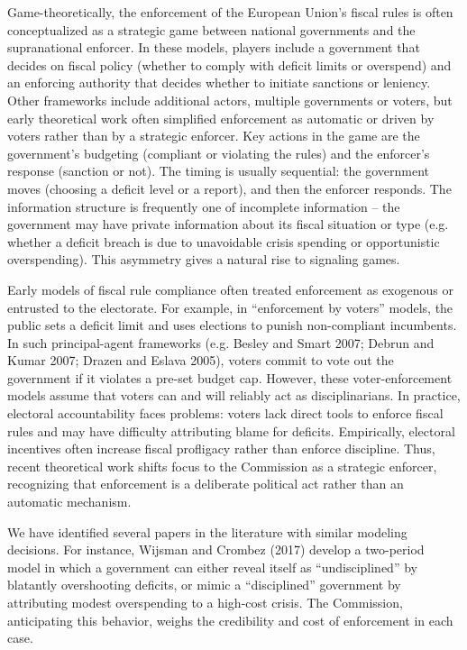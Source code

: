 \documentclass{article}
\begin{document}
Game-theoretically, the enforcement of the European Union’s fiscal rules is often conceptualized as a strategic game between national governments and the supranational enforcer. In these models, players include a government that decides on fiscal policy (whether to comply with deficit limits or overspend) and an enforcing authority that decides whether to initiate sanctions or leniency. Other frameworks include additional actors, multiple governments or voters, but early theoretical work often simplified enforcement as automatic or driven by voters rather than by a strategic enforcer. Key actions in the game are the government’s budgeting (compliant or violating the rules) and the enforcer’s response (sanction or not). The timing is usually sequential: the government moves (choosing a deficit level or a report), and then the enforcer responds. The information structure is frequently one of incomplete information – the government may have private information about its fiscal situation or type (e.g. whether a deficit breach is due to unavoidable crisis spending or opportunistic overspending). This asymmetry gives a natural rise to signaling games.
 
Early models of fiscal rule compliance often treated enforcement as exogenous or entrusted to the electorate. For example, in “enforcement by voters” models, the public sets a deficit limit and uses elections to punish non-compliant incumbents. In such principal-agent frameworks (e.g. Besley and Smart 2007; Debrun and Kumar 2007; Drazen and Eslava 2005), voters commit to vote out the government if it violates a pre-set budget cap. However, these voter-enforcement models assume that voters can and will reliably act as disciplinarians. In practice, electoral accountability faces problems: voters lack direct tools to enforce fiscal rules and may have difficulty attributing blame for deficits. Empirically, electoral incentives often increase fiscal profligacy rather than enforce discipline. Thus, recent theoretical work shifts focus to the Commission as a strategic enforcer, recognizing that enforcement is a deliberate political act rather than an automatic mechanism.
 
We have identified several papers in the literature with similar modeling decisions. For instance, Wijsman and Crombez (2017) develop a two-period model in which a government can either reveal itself as “undisciplined” by blatantly overshooting deficits, or mimic a “disciplined” government by attributing modest overspending to a high-cost crisis. The Commission, anticipating this behavior, weighs the credibility and cost of enforcement in each case.
 
\end{document}
